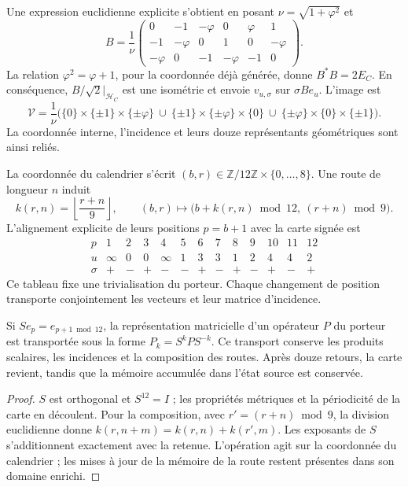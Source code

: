 Une expression euclidienne explicite s'obtient en posant
\(\nu=\sqrt{1+\varphi^2}\) et
\[
 B=\frac1\nu
 \begin{pmatrix}
 0&-1&-\varphi&0&\varphi&1\\
 -1&-\varphi&0&1&0&-\varphi\\
 -\varphi&0&-1&-\varphi&-1&0
 \end{pmatrix}.
\]
La relation \(\varphi^2=\varphi+1\), pour la coordonnée déjà générée, donne \(B^*B=2E_C\). En conséquence, \(B/\sqrt2|_{\mathcal H_C}\) est une isométrie et envoie \(v_{u,\sigma}\) sur \(\sigma Be_u\). L'image est
\[
 \mathcal V=\frac1\nu\bigl(
 \{0\}\times\{\pm1\}\times\{\pm\varphi\}\ \cup\
 \{\pm1\}\times\{\pm\varphi\}\times\{0\}\ \cup\
 \{\pm\varphi\}\times\{0\}\times\{\pm1\}\bigr).
\]
La coordonnée interne, l'incidence et leurs
douze représentants géométriques sont ainsi reliés.

La coordonnée du calendrier s'écrit \((b,r)\in
\mathbb Z/12\mathbb Z\times\{0,\ldots,8\}\). Une route de longueur \(n\)
induit
\[
 k(r,n)=\left\lfloor\frac{r+n}{9}\right\rfloor,\qquad
 (b,r)\longmapsto
 \bigl(b+k(r,n)\bmod12,\ (r+n)\bmod9\bigr).
\]
L'alignement explicite de leurs positions \(p=b+1\) avec la carte signée est
\[
\begin{array}{c|rrrrrrrrrrrr}
p&1&2&3&4&5&6&7&8&9&10&11&12\\ \hline
u&\infty&0&0&\infty&1&3&3&1&2&4&4&2\\
\sigma&+&-&+&-&-&+&-&+&-&+&-&+
\end{array}
\]
Ce tableau fixe une trivialisation du porteur. Chaque changement de position
transporte conjointement les vecteurs et leur matrice d'incidence.

\begin{proposition}
Si \(S e_p=e_{p+1\bmod12}\), la représentation matricielle d'un
opérateur \(P\) du porteur est transportée sous la forme \(P_k=S^kPS^{-k}\).
Ce transport conserve les produits scalaires, les incidences et la composition
des routes. Après douze retours, la carte revient, tandis que la mémoire
accumulée dans l'état source est conservée.
\end{proposition}
\begin{proof}
\(S\) est orthogonal et \(S^{12}=I\) ; les propriétés métriques et la périodicité de la carte en découlent. Pour la composition, avec \(r'=(r+n)\bmod9\), la division euclidienne donne \(k(r,n+m)=k(r,n)+k(r',m)\). Les exposants de \(S\) s'additionnent exactement avec la retenue. L'opération agit sur la coordonnée du calendrier ; les mises à jour de la mémoire de la route restent présentes dans son domaine enrichi.
\end{proof}

